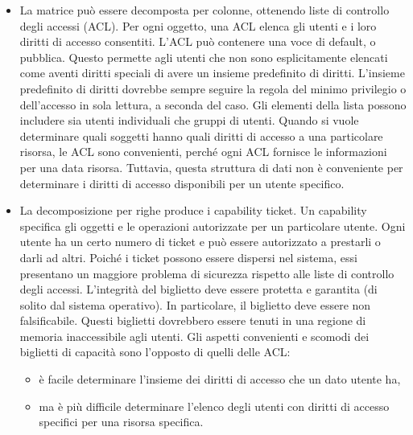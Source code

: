 \begin{itemize}
      \item La matrice può essere decomposta per colonne, ottenendo liste di
            controllo degli accessi (ACL). Per ogni oggetto, una ACL elenca gli utenti
            e i loro diritti di accesso consentiti. L'ACL può contenere una voce di
            default, o pubblica. Questo permette agli utenti che non sono
            esplicitamente elencati come aventi diritti speciali di avere un insieme
            predefinito di diritti. L'insieme predefinito di diritti dovrebbe sempre
            seguire la regola del minimo privilegio o dell'accesso in sola lettura, a
            seconda del caso. Gli elementi della lista possono includere sia utenti
            individuali che gruppi di utenti. Quando si vuole determinare quali
            soggetti hanno quali diritti di accesso a una particolare risorsa, le ACL
            sono convenienti, perché ogni ACL fornisce le informazioni per una data
            risorsa. Tuttavia, questa struttura di dati non è conveniente per
            determinare i diritti di accesso disponibili per un utente specifico.
      \item La decomposizione per righe produce i capability ticket. Un
            capability specifica gli oggetti e le operazioni autorizzate per un
            particolare utente. Ogni utente ha un certo numero di ticket e può essere
            autorizzato a prestarli o darli ad altri. Poiché i ticket possono essere
            dispersi nel sistema, essi presentano un maggiore problema di sicurezza
            rispetto alle liste di controllo degli accessi. L'integrità del biglietto
            deve essere protetta e garantita (di solito dal sistema operativo). In
            particolare, il biglietto deve essere non falsificabile. Questi biglietti
            dovrebbero essere tenuti in una regione di memoria inaccessibile agli
            utenti.  Gli aspetti convenienti e scomodi dei biglietti di capacità sono
            l'opposto di quelli delle ACL:
            \begin{itemize}
                  \item è facile determinare l'insieme dei diritti di accesso
                        che un dato utente ha,
                  \item ma è più difficile determinare l'elenco degli utenti con
                        diritti di accesso specifici per una risorsa specifica.
            \end{itemize}
\end{itemize}